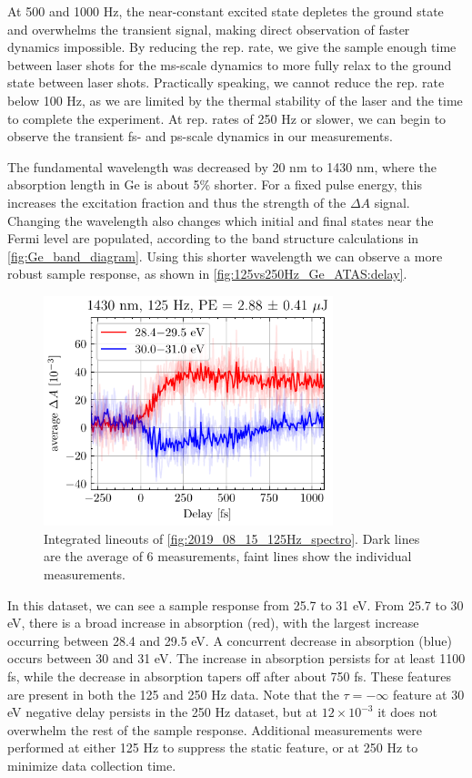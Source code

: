 At 500 and 1000 Hz, the near-constant excited state depletes the ground state and overwhelms the transient signal, making direct observation of faster dynamics impossible. By reducing the rep. rate, we give the sample enough time between laser shots for the ms-scale dynamics to more fully relax to the ground state between laser shots. Practically speaking, we cannot reduce the rep. rate below 100 Hz, as we are limited by the thermal stability of the laser and the time to complete the experiment. At rep. rates of 250 Hz or slower, we can begin to observe the transient fs- and ps-scale dynamics in our measurements.

The fundamental wavelength was decreased by 20 nm to 1430 nm, where the absorption length in Ge is about 5\% shorter. For a fixed pulse energy, this increases the excitation fraction and thus the strength of the $\Delta A$ signal. Changing the wavelength also changes which initial and final states near the Fermi level are populated, according to the band structure calculations in \cref{fig:Ge_band_diagram}. Using this shorter wavelength we can observe a more robust sample response, as shown in \cref{fig:125vs250Hz_Ge_ATAS:delay}.

\begin{figure}
	\centering
	\includegraphics[width=0.75\textwidth]{figures/chap4/Delay123456_1430nm_125Hz_2p88uJ_AvgBands.pdf}
	\caption{Integrated lineouts of \cref{fig:2019_08_15_125Hz_spectro}. Dark lines are the average of 6 measurements, faint lines show the individual measurements.}
	\label{fig:Delay123456_1430nm_125Hz_2p88uJ_AvgBands}
\end{figure}

In this dataset, we can see a sample response from 25.7 to 31 eV. From 25.7 to 30 eV, there is a broad increase in absorption (red), with the largest increase occurring between 28.4 and 29.5 eV. A concurrent decrease in absorption (blue) occurs between 30 and 31 eV. The increase in absorption persists for at least 1100 fs, while the decrease in absorption tapers off after about 750 fs. These features are present in both the 125 and 250 Hz data. Note that the $\tau=-\infty$ feature at 30 eV negative delay persists in the 250 Hz dataset, but at $12 \times 10^{-3}$ it does not overwhelm the rest of the sample response. Additional measurements were performed at either 125 Hz to suppress the static feature, or at 250 Hz to minimize data collection time.

